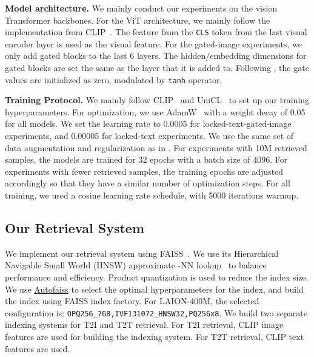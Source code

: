 \documentclass[10pt,twocolumn,letterpaper]{article}
\renewcommand{\paragraph}[1]{\vspace{1.25mm}\noindent\textbf{#1}}
\begin{document}
\paragraph{Model architecture.}
We mainly conduct our experiments on the vision Transformer backbones.  For the ViT architecture, we mainly follow the implementation from CLIP~\cite{radford2021learning}.  The feature from the \texttt{CLS} token from the last visual encoder layer is used as the visual feature.  For the gated-image experiments, we only add gated blocks to the last 6 layers.  The hidden/embedding dimensions for gated blocks are set the same as the layer that it is added to.  Following \cite{alayrac2022flamingo}, the gate values are initialized as zero, modulated by \texttt{tanh} operator.

\paragraph{Training Protocol.}
We mainly follow CLIP~\cite{radford2021learning} and UniCL~\cite{yang2022unicl} to set up our training hyperparameters.  For optimization, we use AdamW~\cite{kingma2014adam} with a weight decay of 0.05 for all models. We set the learning rate to 0.0005 for locked-text-gated-image experiments, and 0.00005 for locked-text experiments.
We use the same set of data augmentation and regularization as in \cite{yang2022unicl}.
For experiments with 10M retrieved samples, the models are trained for 32 epochs with a batch size of 4096.  For experiments with fewer retrieved samples, the training epochs are adjusted accordingly so that they have a similar number of optimization steps.
For all training, we used a cosine learning rate schedule, with 5000 iterations warmup.

\subsection{Our Retrieval System}

\label{sec:retrieval_system}

We implement our retrieval system using FAISS~\cite{johnson2019faiss}.  We use its Hierarchical Navigable Small World (HNSW) approximate -NN lookup~\cite{malkov2018hnsw} to balance performance and efficiency.  Product quantization is used to reduce the index size. We use \href{https://github.com/criteo/autofaiss}{Autofaiss} to select the optimal hyperparameters for the index, and build the index using FAISS index factory.  For LAION-400M, the selected configuration is: \texttt{OPQ256\_768,IVF131072\_HNSW32,PQ256x8}.  We build two separate indexing systems for T2I and T2T retrieval.  For T2I retrieval, CLIP image features are used for building the indexing system.  For T2T retrieval, CLIP text features are used.
\end{document}
